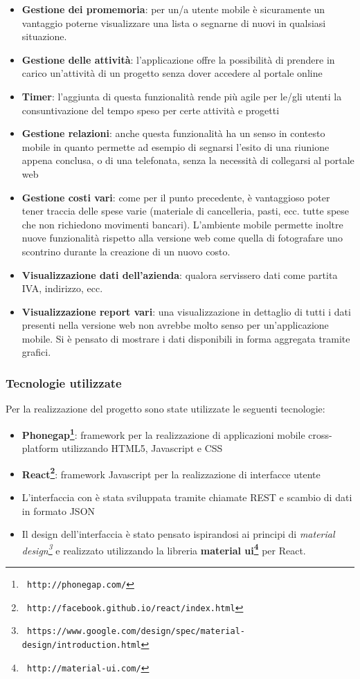 \begin{itemize}
\item \textbf{Gestione dei promemoria}: per un/a utente mobile è sicuramente un vantaggio
poterne visualizzare una lista o segnarne di nuovi in qualsiasi situazione.
\item \textbf{Gestione delle attività}: l'applicazione offre la possibilità di prendere
in carico un'attività di un progetto senza dover accedere al portale online
\item \textbf{Timer}: l'aggiunta di questa funzionalità rende più agile per le/gli utenti
la consuntivazione del tempo speso per certe attività e progetti
\item \textbf{Gestione relazioni}: anche questa funzionalità ha un senso in contesto mobile
in quanto permette ad esempio di segnarsi l'esito di una riunione appena conclusa, o di una
telefonata, senza la necessità di collegarsi al portale web
\item \textbf{Gestione costi vari}: come per il punto precedente, è vantaggioso poter tener
traccia delle spese varie (materiale di cancelleria, pasti, ecc. tutte spese che non
richiedono movimenti bancari). L'ambiente mobile permette inoltre nuove funzionalità rispetto
alla versione web come quella di fotografare uno scontrino durante la creazione di un nuovo
costo.
\item \textbf{Visualizzazione dati dell'azienda}: qualora servissero dati come partita IVA,
indirizzo, ecc.
\item \textbf{Visualizzazione report vari}: una visualizzazione in dettaglio di tutti i dati
presenti nella versione web non avrebbe molto senso per un'applicazione mobile. Si è pensato
di mostrare i dati disponibili in forma aggregata tramite grafici.
\end{itemize}

\subsubsection{Tecnologie utilizzate}
Per la realizzazione del progetto sono state utilizzate le seguenti tecnologie:

\begin{itemize}
\item \textbf{Phonegap\footnote{\texttt{ http://phonegap.com/}}}: framework per 
la realizzazione di applicazioni mobile
cross-platform utilizzando HTML5, Javascript e CSS
\item \textbf{React\footnote{\texttt{ http://facebook.github.io/react/index.html}}}: 
framework Javascript per la realizzazione di interfacce utente
\item L'interfaccia con \fiscoloWeb{} è stata sviluppata tramite chiamate REST e
scambio di dati in formato JSON
\item Il design dell'interfaccia è stato pensato ispirandosi ai principi di
\textit{material design\footnote{\texttt{ https://www.google.com/design/spec/material-design/introduction.html}}} e 
realizzato utilizzando la libreria \textbf{material ui\footnote{\texttt{ http://material-ui.com/}}} per
React.
\end{itemize}

